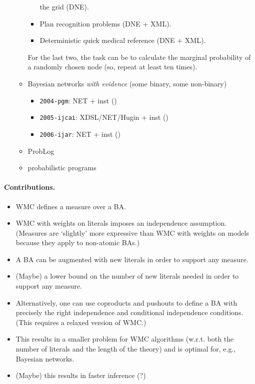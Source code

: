 \documentclass{article}
\theoremstyle{definition}
\theoremstyle{remark}
\begin{document}
\begin{itemize}
\begin{itemize}
\begin{itemize}
      the grid (DNE).
    \item Plan recognition problems (DNE + XML).
    \item Deterministic quick medical reference (DNE + XML).
    \end{itemize}
    For the last two, the task can be to calculate the marginal probability of a
    randomly chosen node (so, repeat at least ten times).
  \item Bayesian networks \emph{with evidence} (some binary, some non-binary)
    \begin{itemize}
    \item \texttt{2004-pgm}: NET + inst (\cite{DBLP:journals/ijar/ChaviraDJ06})
    \item \texttt{2005-ijcai}: XDSL/NET/Hugin + inst (\cite{DBLP:conf/ijcai/ChaviraD05})
    \item \texttt{2006-ijar}: NET + inst (\cite{DBLP:journals/ijar/ChaviraDJ06})
    \end{itemize}
  \item ProbLog \cite{DBLP:conf/uai/FierensBTGR11}
  \item probabilistic programs \cite{DBLP:journals/corr/abs-2005-09089}
  \end{itemize}
\end{itemize}

\paragraph{Contributions.}
\begin{itemize}
\item WMC defines a measure over a BA.
\item WMC with weights on literals imposes an independence assumption. (Measures
  are `slightly' more expressive than WMC with weights on models because they
  apply to non-atomic BAs.)
\item A BA can be augmented with new literals in order to support any measure.
\item (Maybe) a lower bound on the number of new literals needed in order to
  support any measure.
\item Alternatively, one can use coproducts and pushouts to define a BA with
  precisely the right independence and conditional independence conditions.
  (This requires a relaxed version of WMC.)
\item This results in a smaller problem for WMC algorithms (w.r.t. both the
  number of literals and the length of the theory) and is optimal for, e.g.,
  Bayesian networks.
\item (Maybe) this results in faster inference (?)
\end{itemize}
\end{document}
